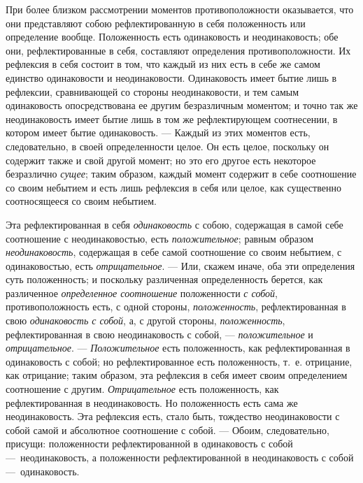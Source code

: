 При более близком рассмотрении моментов противоположности оказывается, что
они представляют собою рефлектированную в себя положенность или определение
вообще. Положенность есть одинаковость и неодинаковость; обе они,
рефлектированные в себя, составляют определения противоположности. Их
рефлексия в себя состоит в том, что каждый из них есть в себе же самом
единство одинаковости и неодинаковости. Одинаковость имеет бытие лишь в
рефлексии, сравнивающей со стороны неодинаковости, и тем самым одинаковость
опосредствована ее другим безразличным моментом; и точно так же
неодинаковость имеет бытие лишь в том же рефлектирующем соотнесении, в
котором имеет бытие одинаковость. — Каждый из этих моментов есть,
следовательно, в своей определенности целое. Он есть целое, поскольку он
содержит также и свой другой момент; но это его другое есть некоторое
безразлично {\em сущее}; таким образом, каждый момент
содержит в себе соотношение со своим небытием и есть лишь рефлексия в себя
или целое, как существенно соотносящееся со своим небытием.

Эта рефлектированная в себя {\em одинаковость} с собою,
содержащая в самой себе соотношение с неодинаковостью, есть
{\em положительное}; равным образом
{\em неодинаковость}, содержащая в себе самой
соотношение со своим небытием, с одинаковостью, есть
{\em отрицательное}. — Или, скажем иначе, оба эти
определения суть положенность; и поскольку различенная определенность
берется, как различенное {\em определенное соотношение}
положенности {\em с собой}, противоположность есть, с
одной стороны, {\em положенность}, рефлектированная в
свою {\em одинаковость с собой}, а, с другой стороны,
{\em положенность}, рефлектированная в свою
неодинаковость с собой, — {\em положительное} и
{\em отрицательное}. —
{\em Положительное} есть положенность, как
рефлектированная в одинаковость с собой; но рефлектированное есть
положенность, т.~е. отрицание, как отрицание; таким образом, эта рефлексия
в себя имеет своим определением соотношение с другим.
{\em Отрицательное} есть положенность, как
рефлектированная в неодинаковость. Но положенность есть сама же
неодинаковость. Эта рефлексия есть, стало быть, тождество неодинаковости с
собой самой и абсолютное соотношение с собой. — Обоим, следовательно,
присущи: положенности рефлектированной в одинаковость с собой
—~неодинаковость, а положенности рефлектированной в неодинаковость с собой
—~одинаковость.

